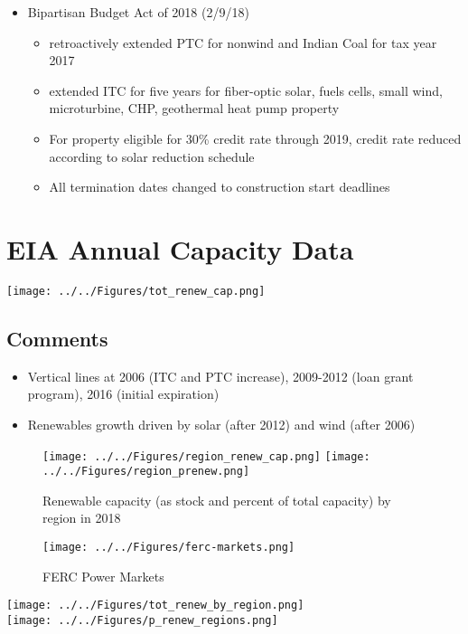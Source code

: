 \documentclass[11pt, oneside]{article}   	%
\begin{document}
\begin{itemize}
\item Bipartisan Budget Act of 2018 (2/9/18)
\begin{itemize}
\item retroactively extended PTC for nonwind and Indian Coal for tax year 2017
\item extended ITC for five years for fiber-optic solar, fuels cells, small wind, microturbine, CHP, geothermal heat pump property
\item For property eligible for 30\% credit rate through 2019, credit rate reduced according to solar reduction schedule
\item All termination dates changed to construction start deadlines
\end{itemize}
\end{itemize}

\section{EIA Annual Capacity Data}


\texttt{[image: ../../Figures/tot\_renew\_cap.png]}


\subsection*{Comments}
\begin{itemize}
\item Vertical lines at 2006 (ITC and PTC increase), 2009-2012 (loan grant program), 2016 (initial expiration)
\item Renewables growth driven by solar (after 2012) and wind (after 2006)
\end{itemize}

\begin{figure}[h!]
\caption{Renewable capacity (as stock and percent of total capacity) by region in 2018}
\texttt{[image: ../../Figures/region\_renew\_cap.png]}
\texttt{[image: ../../Figures/region\_prenew.png]}\\
\end{figure}

\begin{figure}[ht]
\caption{FERC Power Markets}
\texttt{[image: ../../Figures/ferc-markets.png]}
\end{figure}

\texttt{[image: ../../Figures/tot\_renew\_by\_region.png]}\\
\texttt{[image: ../../Figures/p\_renew\_regions.png]}
\end{document}
